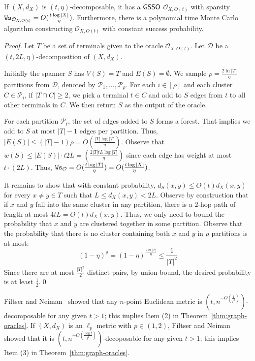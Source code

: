 \begin{claim}\label{clm:strong-sparse-decomposable} If $(X,d_X)$ is $(t,\eta)$-decomposable, it has a  $\mathsf{GSSO}$ $\mathcal{O}_{X,O(t)}$ with sparsity $\mathtt{Ws}_{\mathcal{O}_{X,O(t)}} = O(\frac{t \log |X|}{\eta})$. Furthermore, there is a polynomial time Monte Carlo algorithm constructing  $\mathcal{O}_{X,O(t)}$ with constant success probability.
\end{claim}
\begin{proof}
	Let $T$ be a set of terminals given to the oracle $\mathcal{O}_{X,O(t)}$. Let $\mathcal{D}$ be a $(t, 2L,\eta)$-decomposition of $(X,d_X)$.
	
	Initially the spanner $S$ has $V(S) = T$ and $E(S) = \emptyset$. We sample $\rho = \frac{2\ln |T|}{\eta}$ partitions from $\mathcal{D}$, denoted by $\mathcal{P}_1, \ldots, \mathcal{P}_\rho$. For each $i \in [\rho]$ and each cluster $C \in \mathcal{P}_i$, if $|T\cap C| \geq 2$, we pick a terminal $t\in C$ and add to $S$ edges from $t$ to all other terminals in $C$. We then return $S$ as the output of the oracle.
	
	For each partition $\mathcal{P}_i$, the set of edges added to $S$ forms a forest. That implies we add to $S$ at most $|T|-1$ edges per partition. Thus, $|E(S)| \leq (|T|-1) \rho = O(\frac{|T| \log |T|}{\eta})$. Observe that $w(S) \leq |E(S)| \cdot t 2L = (\frac{2|T| t L \log |T| }{\eta})$ since each edge has weight at most $t\cdot (2L)$. Thus, $\mathtt{Ws}_{\mathcal{O}} = O(\frac{t \log |T|}{\eta})  =  O(\frac{t\log |X|}{\eta})$.
	
	It remains to show that with constant probability, $d_{S}(x,y)  \leq O(t)d_X(x,y)$ for every $x\not= y \in T$  such that $L \leq d_X(x,y) < 2L$. Observe by construction that if $x$ and $y$ fall into the same cluster in any partition, there is a $2$-hop path of length at most $4tL = O(t)d_X(x,y)$. Thus, we only need to bound the probability that $x$ and $y$ are clustered together  in some partition. Observe that the probability that there is no cluster containing both  $x$ and $y$ in $\rho$ partitions is at most:
	\begin{equation*}
		(1-\eta)^\rho  = (1-\eta)^{ \frac{2\ln |T|}{\eta}} \leq \frac{1}{|T|^2}
	\end{equation*}
	Since there are at most $\frac{|T|^2}{2}$ distinct pairs, by union bound, the desired probability is at least $\frac{1}{2}$.\qed
\end{proof}

Filtser and Neiman~\cite{FN18} showed that any $n$-point Euclidean metric is $(t,n^{-O(\frac{1}{t^2})})$-decomposable for any given $t > 1$; this implies Item (2) in Theorem~\ref{thm:graph-oracles}.  If $(X,d_X)$ is an $\ell_p$ metric with $p \in (1,2)$,  Filtser and Neiman~\cite{FN18} showed that it is $(t,n^{-O(\frac{\log t}{t^2})})$-decoposable for any given $t > 1$; this implies Item (3) in Theorem~\ref{thm:graph-oracles}.

